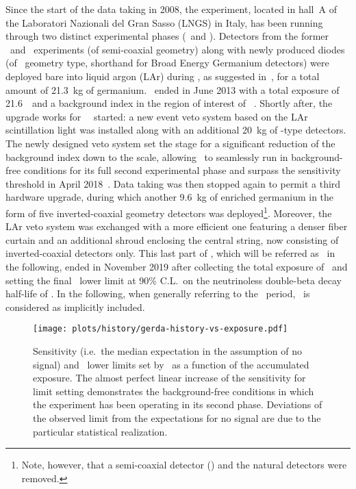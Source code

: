 Since the start of the data taking in 2008, the experiment, located in hall~A of the
Laboratori Nazionali del Gran Sasso (LNGS) in Italy, has been running through two distinct
experimental phases (\phaseone\ and \phasetwo). Detectors from the former \hdm\ and \igex\
experiments (of semi-coaxial geometry) along with newly produced diodes (of \bege\
geometry type, shorthand for Broad Energy Germanium detectors) were deployed bare into
liquid argon (LAr) during \phaseone, as suggested in~\cite{Heusser1995},
for a total amount of 21.3~kg of germanium. \phaseone\ ended in June 2013 with a total
exposure of 21.6~\kgyr\ and a background index in the region of interest of
\pIbi~\cite{Agostini2016}.  Shortly after, the upgrade works for \gerda\ \phasetwo\ started:
a new event veto system based on the LAr scintillation light was installed along with an
additional 20~kg of \bege-type detectors.  The newly designed veto system set the stage for a
significant reduction of the background index down to the \powctsper{-4} scale, allowing
\gerda\ to seamlessly run in background-free conditions for its full second experimental phase
and surpass the \powtenyr{26} sensitivity threshold in April 2018~\cite{Agostini2019a}.
Data taking was then stopped again to permit a third hardware upgrade, during which
another 9.6~kg of enriched germanium in the form of five inverted-coaxial geometry
detectors was deployed\footnote{Note, however, that a semi-coaxial detector (\ANG{1}) and
the natural \GTF{} detectors were removed.}. Moreover, the LAr veto system was exchanged
with a more efficient one featuring a denser fiber curtain and an additional shroud
enclosing the central string, now consisting of inverted-coaxial detectors only. This last
part of \phasetwo, which will be referred as \phasetwop\ in the following, ended in
November 2019 after collecting the total exposure of \gexpo\ and
setting the final \gerda\ lower limit at 90\% C.L.~on the neutrinoless double-beta decay half-life
of \gerdafinallimit. In the following, when generally referring to the \phasetwo\ period,
\phasetwop\ is considered as implicitly included.
\begin{figure}
  \centering
  \texttt{[image: plots/history/gerda-history-vs-exposure.pdf]}
  \caption{%
    Sensitivity (i.e.~the median expectation in the assumption of no signal) and
    \thalfzero\ lower limits set by \gerda\ as a function of the accumulated exposure. The
    almost perfect linear increase of the sensitivity for limit setting demonstrates the
    background-free conditions in which the experiment has been operating in its second
    phase. Deviations of the observed limit from the expectations for no signal are due to
    the particular statistical realization.
  }\label{fig:exp:gerda-history}
\end{figure}
